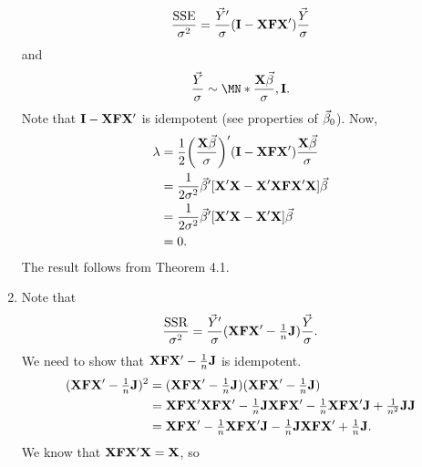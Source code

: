 \begin{Theorem}{}{}
\begin{enumerate}[(1)]
              \[ \frac{\text{SSE}}{\sigma^2}=\frac{\vec{Y}'}{\sigma}(\mathbf{I}-\mathbf{X}\mathbf{F}\mathbf{X}')\frac{\vec{Y}}{\sigma} \]
              and
              \[ \frac{\Vector{Y}}{\sigma}\sim \MN*{\frac{\Matrix{X}\Vector{\beta}}{\sigma},\Matrix{I}}. \]
              Note that $ \mathbf{I}-\mathbf{X}\mathbf{F}\mathbf{X}' $ is idempotent (see properties of $ \vec{\beta}_0 $).
              Now,
              \begin{align*}
                  \lambda
                   & =\frac{1}{2}\biggl(\frac{\mathbf{X}\vec{\beta}}{\sigma}\biggr)'(\mathbf{I}-\mathbf{X}\mathbf{F}\mathbf{X}')\frac{\mathbf{X}\vec{\beta}}{\sigma} \\
                   & =\frac{1}{2\sigma^2}\vec{\beta}'[\mathbf{X}'\mathbf{X}-\mathbf{X}'\mathbf{X}\mathbf{F}\mathbf{X}'\mathbf{X}]\vec{\beta}                         \\
                   & =\frac{1}{2\sigma^2}\vec{\beta}'[\mathbf{X}'\mathbf{X}-\mathbf{X}'\mathbf{X}]\vec{\beta}                                                        \\
                   & =0.
              \end{align*}
              The result follows from Theorem 4.1.
        \item Note that
              \[ \frac{\text{SSR}}{\sigma^2}=\frac{\vec{Y}'}{\sigma}(\mathbf{X}\mathbf{F}\mathbf{X}'-\tfrac{1}{n}\mathbf{J})\frac{\vec{Y}}{\sigma}. \]
              We need to show that $ \mathbf{X}\mathbf{F}\mathbf{X}'-\tfrac{1}{n}\mathbf{J} $ is idempotent.
              \begin{align*}
                  (\mathbf{X}\mathbf{F}\mathbf{X}'-\tfrac{1}{n}\mathbf{J})^2
                   & =(\mathbf{X}\mathbf{F}\mathbf{X}'-\tfrac{1}{n}\mathbf{J})(\mathbf{X}\mathbf{F}\mathbf{X}'-\tfrac{1}{n}\mathbf{J})                                                                                              \\
                   & =\mathbf{X}\mathbf{F}\mathbf{X}'\mathbf{X}\mathbf{F}\mathbf{X}'-\tfrac{1}{n}\mathbf{J}\mathbf{X}\mathbf{F}\mathbf{X}'-\tfrac{1}{n}\mathbf{X}\mathbf{F}\mathbf{X}'\mathbf{J}+\tfrac{1}{n^2}\mathbf{J}\mathbf{J} \\
                   & =\mathbf{X}\mathbf{F}\mathbf{X}'-\tfrac{1}{n}\mathbf{X}\mathbf{F}\mathbf{X}'\mathbf{J}-\tfrac{1}{n}\mathbf{J}\mathbf{X}\mathbf{F}\mathbf{X}'+\tfrac{1}{n}\mathbf{J}.
              \end{align*}
              We know that $ \mathbf{X}\mathbf{F}\mathbf{X}'\mathbf{X}=\mathbf{X} $, so

\end{enumerate}
\end{Theorem}
